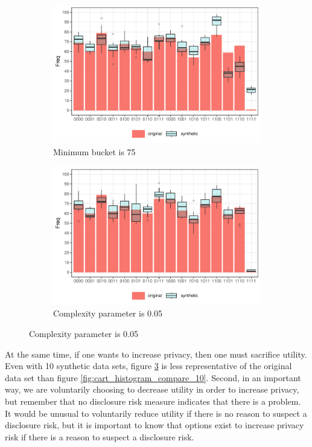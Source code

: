\documentclass[runningheads]{llncs}
\begin{document}
\begin{figure}[!h]
    \centering
    \caption{Compare original and synthetic data}
    \begin{subfigure}{0.48\textwidth}
        \includegraphics[width=\textwidth]{../graphs/graph_cart_modified_mb_histogram_compare_10_v1.pdf}
        \caption{Minimum bucket is 75}
        \label{fig:attacker_modified_mb}
    \end{subfigure}
    \hfill
    \begin{subfigure}{0.48\textwidth}
        \includegraphics[width=\textwidth]{../graphs/graph_cart_modified_cp_histogram_compare_10_v1.pdf}
        \caption{Complexity parameter is 0.05}
        \label{fig:attacker_modified_cp}
    \end{subfigure}
    \label{fig:compare_modified}
\end{figure}

At the same time, if one wants to increase privacy, then one must sacrifice utility.  Even with 10 synthetic data sets, figure \ref{fig:compare_modified} is less representative of the original data set than figure \ref{fig:cart_histogram_compare_10}.  Second, in an important way, we are voluntarily choosing to decrease utility in order to increase privacy, but remember that no disclosure risk measure indicates that there is a problem.  It would be unusual to voluntarily reduce utility if there is no reason to suspect a disclosure risk, but it is important to know that options exist to increase privacy risk if there is a reason to suspect a disclosure risk.
\end{document}
